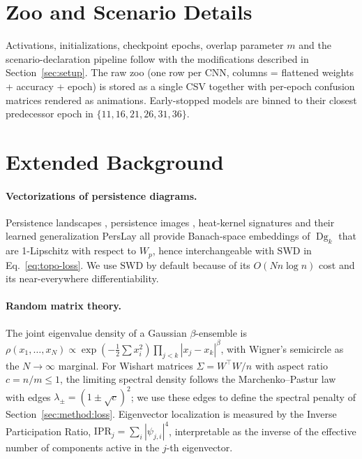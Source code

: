 \documentclass{article}
\newcommand{\SWD}{\mathrm{SWD}}
\newcommand{\Dg}{\operatorname{Dg}}
\begin{document}
\section{Zoo and Scenario Details}
\label{app:zoo}

Activations, initializations, checkpoint epochs, overlap parameter $m$
and the scenario-declaration pipeline follow
\citet{schurholtHyperRepresentationsLearningPopulations2024} with the
modifications described in Section~\ref{sec:setup}.  The raw zoo (one
row per CNN, columns = flattened weights + accuracy + epoch) is stored as
a single CSV together with per-epoch confusion matrices rendered as
animations.  Early-stopped models are binned to their closest
predecessor epoch in $\{11,16,21,26,31,36\}$.

\section{Extended Background}
\label{app:background}

\paragraph{Vectorizations of persistence diagrams.}
Persistence landscapes \citep{bubenikStatisticalTopologicalData2015},
persistence images \citep{adamsPersistenceImagesStable2017}, heat-kernel
signatures \citep{reininghausStableMultiScaleKernel2014} and their
learned generalization PersLay \citep{carriereSlicedWassersteinKernel2017}
all provide Banach-space embeddings of $\Dg_k$ that are 1-Lipschitz with
respect to $W_p$, hence interchangeable with $\SWD$ in
Eq.~\eqref{eq:topo-loss}.  We use $\SWD$ by default because of its
$O(Nn\log n)$ cost and its near-everywhere differentiability.

\paragraph{Random matrix theory.}
The joint eigenvalue density of a Gaussian $\beta$-ensemble is
$\rho(x_1,\ldots,x_N)\propto\exp(-\tfrac12\sum x_i^2)\prod_{j<k}|x_j-x_k|^\beta$,
with Wigner's semicircle as the $N\to\infty$ marginal.  For Wishart
matrices $\Sigma=W^\top W/n$ with aspect ratio $c=n/m\le 1$, the limiting
spectral density follows the Marchenko--Pastur law with edges
$\lambda_\pm=(1\pm\sqrt{c})^2$; we use these edges to define the
spectral penalty of Section~\ref{sec:method:loss}.  Eigenvector
localization is measured by the Inverse Participation Ratio,
$\mathrm{IPR}_j=\sum_i|\psi_{j,i}|^4$, interpretable as the inverse of
the effective number of components active in the $j$-th eigenvector.
\end{document}
